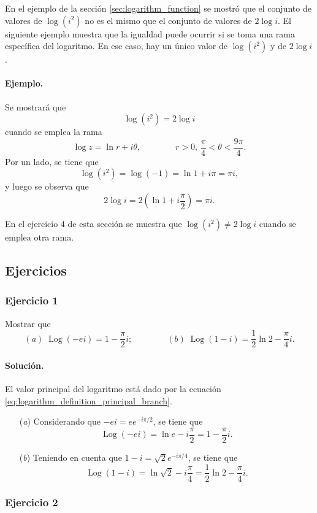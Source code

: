 \documentclass[a4paper]{report}
\DeclareMathOperator{\Log}{Log}
\begin{document}
En el ejemplo de la sección \ref{sec:logarithm_function} se mostró que el conjunto de valores de \(\log(i^2)\) no es el mismo que el conjunto de valores de \(2\log i\). El siguiente ejemplo muestra que la igualdad puede ocurrir si se toma una rama específica del logaritmo. En ese caso, hay un único valor de \(\log(i^2)\) y de \(2\log i\).

\paragraph{Ejemplo.} Se mostrará que 
\[
 \log(i^2)=2\log i
\]
cuando se emplea la rama 
\[
 \log z=\ln r+i\theta,\qquad\qquad 
 r>0,\,\frac{\pi}{4}<\theta<\frac{9\pi}{4}.
\]
Por un lado, se tiene que 
\[
 \log(i^2)=\log(-1)=\ln1+i\pi=\pi i,
\]
y luego se observa que 
\[
 2\log i=2\left(\ln1+i\frac{\pi}{2}\right)=\pi i.
\]

En el ejercicio 4 de esta sección se muestra que \(\log(i^2)\neq2\log i\) cuando se emplea otra rama.

\subsection*{Ejercicios}

\subsubsection{Ejercicio 1}

Mostrar que
\[
 (\textit{a})\;\Log(-ei)=1-\frac{\pi}{2}i;\qquad\qquad 
 (\textit{b})\;\Log(1-i)=\frac{1}{2}\ln2-\frac{\pi}{4}i.
\]

\paragraph{Solución.} El valor principal del logaritmo está dado por la ecuación \ref{eq:logarithm_definition_principal_branch}.

\begin{enumerate}
 \item[(\textit{a})] Considerando que \(-ei=ee^{-i\pi/2}\), se tiene que 
 \[
  \Log(-ei)=\ln e-i\frac{\pi}{2}=1-\frac{\pi}{2}i.
 \]
 \item[(\textit{b})] Teniendo en cuenta que \(1-i=\sqrt{2}e^{-i\pi/4}\), se tiene que 
 \[
  \Log(1-i)=\ln\sqrt{2}-i\frac{\pi}{4}=\frac{1}{2}\ln2-\frac{\pi}{4}i.
 \]
\end{enumerate}

\subsubsection{Ejercicio 2}
 
\end{document}
